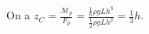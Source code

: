 
\begin{corrige}
On a $z_C = \frac{\mathcal{M}_p}{F_p}=\frac{\frac{1}{6} \rho g L h^3}{\frac{1}{2} \rho g L h^2}=\frac{1}{3} h$.
\end{corrige}



\finEntrainement






















\afficheReponsesMelangees

\finFicheEntrainement                                                                        %


\ifdefined\mainIsLoaded\else
\printReponsesEtCorriges
\fi
